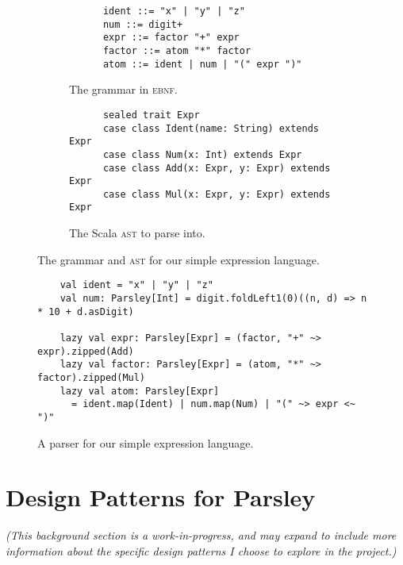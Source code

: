 \begin{figure}[htbp]
  \centering
  \begin{subfigure}{0.6\textwidth}
    \vspace{3ex} %
    \centering
    \begin{verbatim}
      ident ::= "x" | "y" | "z"
      num ::= digit+
      expr ::= factor "+" expr
      factor ::= atom "*" factor
      atom ::= ident | num | "(" expr ")"
    \end{verbatim}
    \caption{The grammar in \textsc{ebnf}.}
    \label{fig:simple-grammar-ebnf}
  \end{subfigure}
  \begin{subfigure}{0.8\textwidth}
    \vspace{5ex} %
    \centering
    \begin{verbatim}
      sealed trait Expr
      case class Ident(name: String) extends Expr
      case class Num(x: Int) extends Expr
      case class Add(x: Expr, y: Expr) extends Expr
      case class Mul(x: Expr, y: Expr) extends Expr
    \end{verbatim}
    \caption{The Scala \textsc{ast} to parse into.}
    \label{fig:simple-grammar-ast}
  \end{subfigure}
  \caption{The grammar and \textsc{ast} for our simple expression language.}
\end{figure}

\begin{figure}[htbp]
  \centering
  \begin{verbatim}
    val ident = "x" | "y" | "z"
    val num: Parsley[Int] = digit.foldLeft1(0)((n, d) => n * 10 + d.asDigit)

    lazy val expr: Parsley[Expr] = (factor, "+" ~> expr).zipped(Add)
    lazy val factor: Parsley[Expr] = (atom, "*" ~> factor).zipped(Mul)
    lazy val atom: Parsley[Expr]
      = ident.map(Ident) | num.map(Num) | "(" ~> expr <~ ")"
  \end{verbatim}
  \caption{A parser for our simple expression language.}
  \label{fig:simple-grammar-parser}
\end{figure}

\section{Design Patterns for Parsley}
\textit{(This background section is a work-in-progress, and may expand to include more information about the specific design patterns I choose to explore in the project.)}

